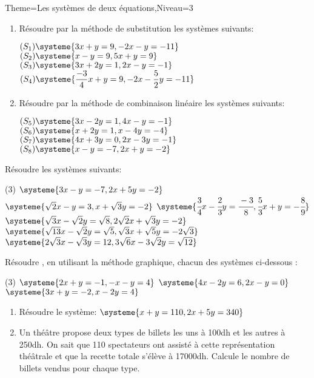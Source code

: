 \documentclass[a4paper,12pt]{article}
\begin{document}
\begin{Maquette}[Fiche]{Theme=Les systèmes de deux équations,Niveau=3}

\begin{exercice}
\begin{enumerate}
\item Résoudre par la méthode de substitution les systèmes suivants:

$(S_1)\systeme{3x+y=9,-2x-y=-11}$
$(S_2)\systeme{x-y=9,5x+y=9}$
$(S_3)\systeme{3x+2y=1,2x-y=-1}$
$(S_4)\systeme{\dfrac{-3}{4}x+y=9,-2x-\dfrac{5}{2}y=-11}$

\item  Résoudre par la méthode de combinaison linéaire les systèmes suivants:

$(S_5)\systeme{3x-2y=1,4x-y=-1}$
$(S_6)\systeme{x+2y=1,x-4y=-4}$
$(S_7)\systeme{4x+3y=0,2x-3y=-1}$
$(S_8)\systeme{x-y=-7,2x+y=-2}$
\end{enumerate}
\end{exercice}

\begin{exercice}
Résoudre  les systèmes suivants:
\begin{tasks}(3)
\task $\systeme{3x-y=-7,2x+5y=-2}$
\task $\systeme{\sqrt{2}x-y=3,x+\sqrt{3}y=-2}$
\task $\systeme{\cfrac{3}{4}x-\cfrac{2}{3}y=\cfrac{-3}{8},\cfrac{5}{3}x+y=-\cfrac{8}{9}}$
\task $\systeme{\sqrt{3}x-\sqrt{2}y=\sqrt{8},2\sqrt{2}x+\sqrt{3}y=-2}$
\task $\systeme{\sqrt{13}x-\sqrt{2}y=\sqrt{5},\sqrt{3}x+\sqrt{5}y=-2\sqrt{3}}$
\task $\systeme{2\sqrt{3}x-\sqrt{3}y=12,3\sqrt{6}x-3\sqrt{2}y=\sqrt{12}}$
\end{tasks}
\end{exercice}

\begin{exercice}
Résoudre , en utilisant la méthode graphique, chacun des systèmes ci-dessous :
\begin{tasks}(3)
\task[$S_1$] $\systeme{2x+y=-1,-x-y=4}$
\task[$S_2$] $\systeme{4x-2y=6,2x-y=0}$
\task[$S_3$] $\systeme{3x+y=-2,x-2y=4}$
\end{tasks}
\end{exercice}

\begin{exercice}
\begin{enumerate}
\item Résoudre le système: $\systeme{x+y=110,2x+5y=340}$
\item Un théâtre propose deux types de billets les uns à 100dh et les autres à 250dh. On sait que 110 spectateurs ont assisté à cette représentation théâtrale et que la recette totale s'élève à 17000dh.\newline
Calcule le nombre de billets vendus pour chaque type.
\end{enumerate}
\end{exercice}


\end{Maquette}
\end{document}
